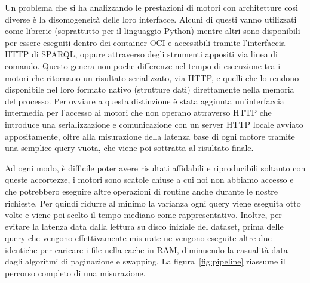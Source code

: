 Un problema che si ha analizzando le prestazioni di motori con architetture così diverse è la disomogeneità delle loro interfacce.
Alcuni di questi vanno utilizzati come librerie (soprattutto per il linguaggio Python) mentre altri sono disponibili per essere
eseguiti dentro dei container OCI e accessibili tramite l'interfaccia HTTP di SPARQL, oppure attraverso degli strumenti
appositi via linea di comando. Questo genera non poche differenze nel tempo di esecuzione tra i motori che ritornano un risultato
serializzato, via HTTP, e quelli che lo rendono disponibile nel loro formato nativo (strutture dati) direttamente nella memoria
del processo. Per ovviare a questa distinzione è stata aggiunta un'interfaccia intermedia per l'accesso ai motori che non operano
attraverso HTTP che introduce una serializzazione e comunicazione con un server HTTP locale avviato appositamente, oltre alla misurazione
della latenza base di ogni motore tramite una semplice query vuota, che viene poi sottratta al risultato finale.
\par Ad ogni modo, è difficile poter avere risultati affidabili e riproducibili soltanto con queste accortezze, i motori sono scatole
chiuse a cui noi non abbiamo accesso e che potrebbero eseguire altre operazioni di routine anche durante le nostre richieste. Per quindi ridurre
al minimo la varianza ogni query viene eseguita otto volte e viene poi scelto il tempo mediano come rappresentativo.
Inoltre, per evitare la latenza data dalla lettura su disco iniziale del dataset, prima delle query che vengono effettivamente
misurate ne vengono eseguite altre due identiche per caricare i file nella cache in RAM, diminuendo la casualità data dagli algoritmi 
di paginazione e swapping. La figura~\ref{fig:pipeline} riassume il percorso completo di una misurazione.

